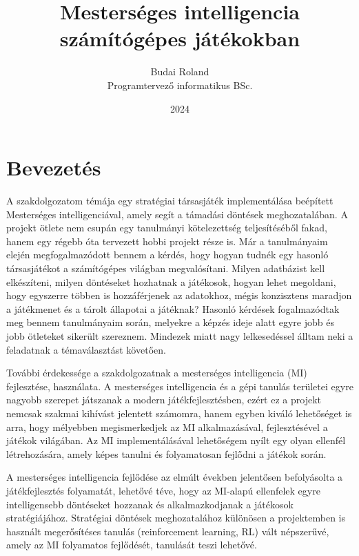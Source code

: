 \documentclass[
]{thesis-ekf}
\theoremstyle{definition}
\theoremstyle{remark}
\begin{document}
\title{Mesterséges intelligencia számítógépes játékokban}
\author{Budai Roland\\Programtervező informatikus BSc.}
\date{2024}
\maketitle

\tableofcontents

\chapter*{Bevezetés}

A szakdolgozatom témája egy stratégiai társasjáték implementálása beépített Mesterséges intelligenciával, amely segít a támadási döntések meghozatalában. A projekt ötlete nem csupán egy tanulmányi kötelezettség teljesítéséből fakad, hanem egy régebb óta tervezett hobbi projekt része is. Már a tanulmányaim elején megfogalmazódott bennem a kérdés, hogy hogyan tudnék egy hasonló társasjátékot a számítógépes világban megvalósítani. Milyen adatbázist kell elkészíteni, milyen döntéseket hozhatnak a játékosok, hogyan lehet megoldani, hogy egyszerre többen is hozzáférjenek az adatokhoz, mégis konzisztens maradjon a játékmenet és a tárolt állapotai a játéknak? Hasonló kérdések fogalmazódtak meg bennem tanulmányaim során, melyekre a képzés ideje alatt egyre jobb és jobb ötleteket sikerült szereznem. Mindezek miatt nagy lelkesedéssel álltam neki a feladatnak a témaválasztást követően. 

További érdekessége a szakdolgozatnak a mesterséges intelligencia (MI) fejlesztése, használata. A mesterséges intelligencia és a gépi tanulás területei egyre nagyobb szerepet játszanak a modern játékfejlesztésben, ezért ez a projekt nemcsak szakmai kihívást jelentett számomra, hanem egyben kiváló lehetőséget is arra, hogy mélyebben megismerkedjek az MI alkalmazásával, fejlesztésével a játékok világában. Az MI implementálásával lehetőségem nyílt egy olyan ellenfél létrehozására, amely képes tanulni és folyamatosan fejlődni a játékok során. 

A mesterséges intelligencia fejlődése az elmúlt években jelentősen befolyásolta a játékfejlesztés folyamatát, lehetővé téve, hogy az MI-alapú ellenfelek egyre intelligensebb döntéseket hozzanak és alkalmazkodjanak a játékosok stratégiájához. Stratégiai döntések meghozatalához különösen a projektemben is használt megerősítéses tanulás (reinforcement learning, RL) vált népszerűvé, amely az MI folyamatos fejlődését, tanulását teszi lehetővé.
\end{document}
